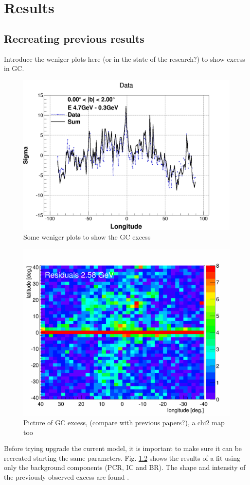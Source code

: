 \chapter{Results}
\label{ch:results}
%

\section{Recreating previous results}

Introduce the weniger plots here (or in the state of the research?) to show excess in GC.
\begin{figure}[h]
  \centering
  \includegraphics[width=.5\linewidth]{pic/results/Weniger_SUM_b0-2_E4,7-0,31GeV.png}
  \caption{Some weniger plots to show the GC excess}
  \label{fig:weniger_plot}
\end{figure}



\begin{figure}[h]
  \centering
  \includegraphics[width=.5\linewidth]{pic/results/BKGonly_halo_residuals.png}
  \caption{Picture of GC excess, (compare with previous papers?), a chi2 map too}
  \label{fig:original_GC_excess}
\end{figure}

Before trying upgrade the current model, it is important to make sure it can be recreated starting the same parameters. Fig. \ref{fig:original_GC_excess} shows the results of a fit using only the background components (PCR, IC and BR). The shape and intensity of the previously observed excess are found .\\

